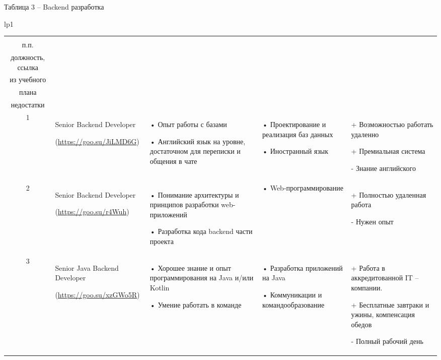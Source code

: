 \documentclass[14pt]{extreport}
\begin{document}
\begin{landscape}
\newpage
Таблица 3 – Backend разработка
\begin{longtable}[H]{lp{1\linewidth}}
\caption{Backend разработка \label{table3}}


\centering

\begin{small}


    \begin{tabular}{|c|p{}|p{6cm}|p{5cm}|p{5cm}|}
	\hline 
	\makecell{№ \\ п.п.} &	\makecell{Наименование,\\ должность, ссылка} &	\makecell{Требования} & 	\makecell{Дисциплины \\ из учебного \\плана} &	\makecell{Преимущества и \\недостатки}  \\ 
	\hline 
	1	& Senior Backend Developer 
	
(\url{https://goo.su/JiLMD6G}) &
•	Опыт работы с базами

•	Английский язык на уровне, достаточном для переписки и общения в чате &
•	Проектирование и реализация баз данных

•	Иностранный язык &
+	Возможностью работать удаленно

+	Премиальная система

-	Знание английского \\


	\hline
	2	& Senior Backend Developer
	
(\url{https://goo.su/r4Wuh}) &
•	Понимание архитектуры и принципов разработки web-приложений

•	Разработка кода backend части проекта &
•	Web-программирование &
+	Полностью удаленная работа

-	Нужен опыт
\\

	\hline 
	3	& Senior Java Backend Developer
	
(\url{https://goo.su/xzGWo5R}) 	&
•	Хорошее знание и опыт программирования на Java и/или Kotlin

•	Умение работать в команде &
•	Разработка приложений на Java

•	Коммуникации и командообразование &
+	Работа в аккредитованной IT – компании.

+	Бесплатные завтраки и ужины, компенсация обедов

-	Полный рабочий день \\


	\hline



\end{tabular}
\end{small}
\end{longtable}
\end{landscape}
\end{document}
